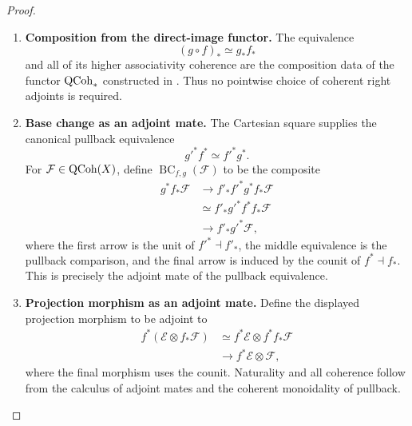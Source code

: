 \begin{proof}
\leavevmode
\begin{enumerate}[label=\textup{(\arabic*)}]
    \item \textbf{Composition from the direct-image functor.}
    The equivalence
    \[
        (g\circ f)_*\simeq g_*f_*
    \]
    and all of its higher associativity coherence are the composition data of
    the functor \(\operatorname{QCoh}_*\) constructed in
    . Thus no pointwise choice of
    coherent right adjoints is required.

    \item \textbf{Base change as an adjoint mate.}
    The Cartesian square supplies the canonical pullback equivalence
    \[
        g'^*f^*
        \simeq
        f'^*g^*.
    \]
    For \(\mathcal F\in\operatorname{QCoh}(X)\), define
    \(\operatorname{BC}_{f,g}(\mathcal F)\) to be the composite
    \[
    \begin{aligned}
        g^*f_*\mathcal F
        &\longrightarrow
        f'_*f'^*g^*f_*\mathcal F
        \\
        &\simeq
        f'_*g'^*f^*f_*\mathcal F
        \\
        &\longrightarrow
        f'_*g'^*\mathcal F,
    \end{aligned}
    \]
    where the first arrow is the unit of \(f'^*\dashv f'_*\), the middle
    equivalence is the pullback comparison, and the final arrow is induced by
    the counit of \(f^*\dashv f_*\). This is precisely the adjoint mate of
    the pullback equivalence.

    \item \textbf{Projection morphism as an adjoint mate.}
    Define the displayed projection morphism to be adjoint to
    \[
    \begin{aligned}
        f^*(\mathcal E\otimes f_*\mathcal F)
        &\simeq
        f^*\mathcal E\otimes f^*f_*\mathcal F
        \\
        &\longrightarrow
        f^*\mathcal E\otimes\mathcal F,
    \end{aligned}
    \]
    where the final morphism uses the counit. Naturality and all coherence
    follow from the calculus of adjoint mates and the coherent monoidality of
    pullback.
\end{enumerate}
\end{proof}

